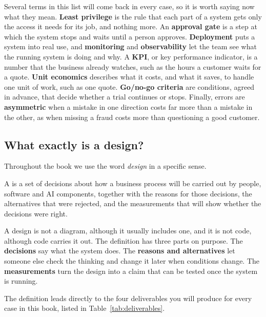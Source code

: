 Several terms in this list will come back in every case, so it is worth saying now what they mean. \textbf{Least privilege} is the rule that each part of a system gets only the access it needs for its job, and nothing more. An \textbf{approval gate} is a step at which the system stops and waits until a person approves. \textbf{Deployment} puts a system into real use, and \textbf{monitoring} and \textbf{observability} let the team see what the running system is doing and why. A \textbf{KPI}, or key performance indicator, is a number that the business already watches, such as the hours a customer waits for a quote. \textbf{Unit economics} describes what it costs, and what it saves, to handle one unit of work, such as one quote. \textbf{Go/no-go criteria} are conditions, agreed in advance, that decide whether a trial continues or stops. Finally, errors are \textbf{asymmetric} when a mistake in one direction costs far more than a mistake in the other, as when missing a fraud costs more than questioning a good customer.


\subsection{What exactly is a design?}

Throughout the book we use the word \emph{design} in a specific sense.

\begin{definition}
A  is a set of decisions about how a business process will be carried out by people, software and AI components, together with the reasons for those decisions, the alternatives that were rejected, and the measurements that will show whether the decisions were right.
\end{definition}

A design is not a diagram, although it usually includes one, and it is not code, although code carries it out. The definition has three parts on purpose. The \textbf{decisions} say what the system does. The \textbf{reasons and alternatives} let someone else check the thinking and change it later when conditions change. The \textbf{measurements} turn the design into a claim that can be tested once the system is running.

The definition leads directly to the four deliverables you will produce for every case in this book, listed in Table~\ref{tab:deliverables}.


